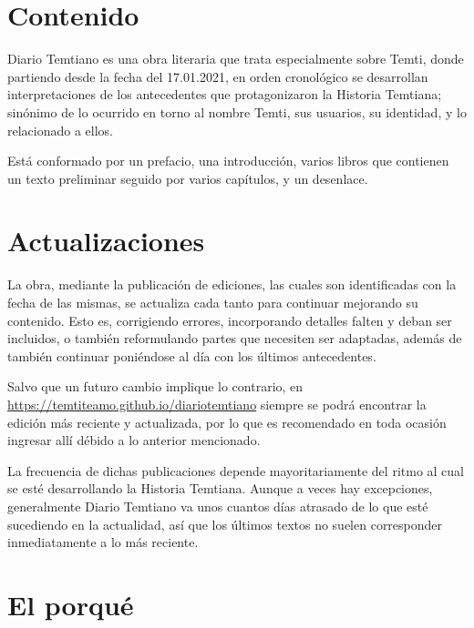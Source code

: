\documentclass[
]{book}
\begin{document}
\hypertarget{contenido}{%
\section*{Contenido}\label{contenido}}

Diario Temtiano es una obra literaria que trata especialmente sobre Temti, donde partiendo desde la fecha del 17.01.2021, en orden cronológico se desarrollan interpretaciones de los antecedentes que protagonizaron la Historia Temtiana; sinónimo de lo ocurrido en torno al nombre Temti, sus usuarios, su identidad, y lo relacionado a ellos.

Está conformado por un prefacio, una introducción, varios libros que contienen un texto preliminar seguido por varios capítulos, y un desenlace.

\hypertarget{actualizaciones}{%
\section*{Actualizaciones}\label{actualizaciones}}

La obra, mediante la publicación de ediciones, las cuales son identificadas con la fecha de las mismas, se actualiza cada tanto para continuar mejorando su contenido. Esto es, corrigiendo errores, incorporando detalles falten y deban ser incluidos, o también reformulando partes que necesiten ser adaptadas, además de también continuar poniéndose al día con los últimos antecedentes.

Salvo que un futuro cambio implique lo contrario, en \url{https://temtiteamo.github.io/diariotemtiano} siempre se podrá encontrar la edición más reciente y actualizada, por lo que es recomendado en toda ocasión ingresar allí débido a lo anterior mencionado.

La frecuencia de dichas publicaciones depende mayoritariamente del ritmo al cual se esté desarrollando la Historia Temtiana. Aunque a veces hay excepciones, generalmente Diario Temtiano va unos cuantos días atrasado de lo que esté sucediendo en la actualidad, así que los últimos textos no suelen corresponder inmediatamente a lo más reciente.

\hypertarget{el-porquuxe9}{%
\section*{El porqué}\label{el-porquuxe9}}
\end{document}
